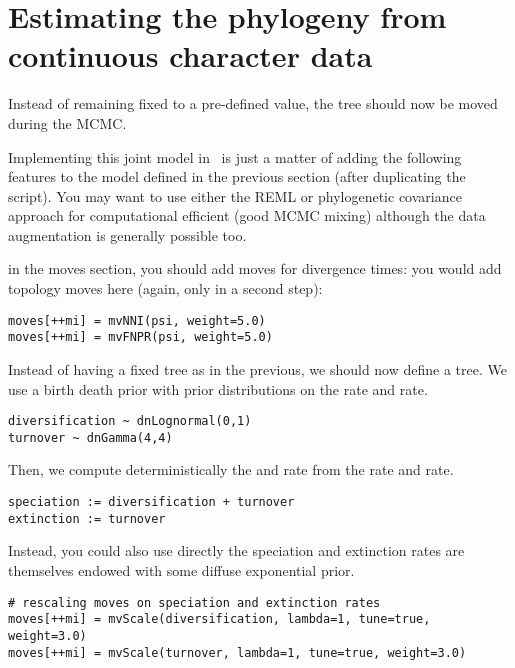 \section{Estimating the phylogeny from continuous character data}
Instead of remaining fixed to a pre-defined value, the tree should now be moved during the MCMC.

Implementing this joint model in \RevBayes~is just a matter of adding the following features to the model defined in the previous section (after duplicating the script).
You may want to use either the REML or phylogenetic covariance approach for computational efficient (\IE good MCMC mixing) although the data augmentation is generally possible too.


in the moves section, you should add moves for divergence times:
you would add topology moves here (again, only in a second step):
{\tt \small \begin{snugshade*}
\begin{lstlisting}
moves[++mi] = mvNNI(psi, weight=5.0)
moves[++mi] = mvFNPR(psi, weight=5.0)
\end{lstlisting}
\end{snugshade*}}

Instead of having a fixed tree as in the previous, we should now define a  tree. We use a birth death prior with prior distributions on the  rate and  rate.
{\tt \small \begin{snugshade*}
\begin{lstlisting}
diversification ~ dnLognormal(0,1)
turnover ~ dnGamma(4,4)
\end{lstlisting}
\end{snugshade*}}
Then, we compute deterministically the  and  rate from the  rate and  rate.
{\tt \small \begin{snugshade*}
\begin{lstlisting}
speciation := diversification + turnover
extinction := turnover
\end{lstlisting}
\end{snugshade*}}
Instead, you could also use directly the speciation and extinction rates are themselves endowed with some diffuse exponential prior.

{\tt \small \begin{snugshade*}
\begin{lstlisting}
# rescaling moves on speciation and extinction rates
moves[++mi] = mvScale(diversification, lambda=1, tune=true, weight=3.0)
moves[++mi] = mvScale(turnover, lambda=1, tune=true, weight=3.0)
\end{lstlisting}
\end{snugshade*}}

